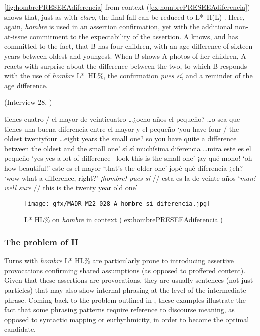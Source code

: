 \autoref{fig:hombrePRESEEAdiferencia} from context (\ref{ex:hombrePRESEEAdiferencia}) shows that, just as with \textit{claro}, the final fall can be reduced to L*~H(L)-. Here, again, \textit{hombre} is used in an assertion confirmation, yet with the additional non-at-issue commitment to the expectability of the assertion. A knows, and has committed to the fact, that B has four children, with an age difference of sixteen years between oldest and youngest. When B shows A photos of her children, A reacts with surprise about the difference between the two, to which B responds with the use of \textit{hombre} L*~HL\%, the confirmation \textit{pues sí}, and a reminder of the age difference.

\begin{exe}
	\ex (Interview 28, \cite{PRESEEA.20142020}) \label{ex:hombrePRESEEAdiferencia}
	\begin{xlist}[A:]
	  tienes cuatro / el mayor de veinticuatro \ldots ¿ocho años el pequeño? \ldots o sea que tienes una buena diferencia entre el mayor y el pequeño 
	\glt `you have four / the oldest twentyfour \ldots eight years the small one? so you have quite a difference between the oldest and the small one'
	  sí sí muchísima diferencia \ldots mira este es el pequeño 
	\glt `yes yes a lot of difference \ look this is the small one' 
	  ¡ay qué mono!
	\glt `oh how beautiful!'
	  este es el mayor 
	\glt `that's the older one'
	  jopé qué diferencia ¿eh? 
	\glt `wow what a difference, right?' 
	  \textit{¡hombre! pues sí} // esta es la de veinte años 
	\glt `\textit{man! well sure} // this is the twenty year old one' 
	\end{xlist}
\end{exe}

\vfill
\begin{figure}[H]
	\texttt{[image: gfx/MADR\_M22\_028\_A\_hombre\_si\_diferencia.jpg]}
	\caption{L* HL\% on \textit{hombre} in context (\ref{ex:hombrePRESEEAdiferencia}) \href{https://osf.io/46jmb/}{\faVolumeUp} \label{fig:hombrePRESEEAdiferencia}}
\end{figure}
\vfill\pagebreak

\subsubsection{The problem of H$-$}\label{ch:5.2.2.3}

Turns with \textit{hombre} L* HL\% are particularly prone to introducing assertive provocations confirming shared assumptions (as opposed to proffered content). Given that these assertions are provocations, they are usually sentences (not just particles) that may also show internal phrasing at the level of the intermediate phrase. Coming back to the problem outlined in , these examples illustrate the fact that some phrasing patterns require reference to discourse meaning, as opposed to syntactic mapping or eurhythmicity, in order to become the optimal candidate.  

